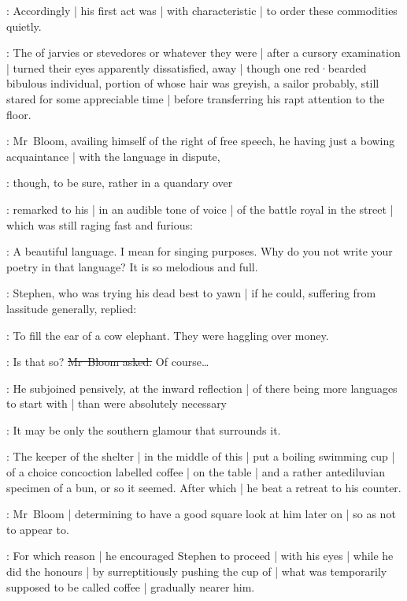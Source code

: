 :
Accordingly |
his first act was |
with characteristic  |
to order these commodities quietly.

:
The  of jarvies or stevedores or whatever they were |
after a cursory examination |
turned their eyes apparently dissatisfied,
away |
though one red·bearded bibulous individual,
portion of whose hair was greyish,
a sailor probably,
still stared for some appreciable time |
before transferring his rapt attention to the floor.

:
Mr~Bloom,
availing himself of the right of free speech,
he having just a bowing acquaintance |
with the language in dispute,

:
though,
to be sure,
rather in a quandary over 

:
remarked to his  |
in an audible tone of voice |
 of the battle royal in the street |
which was still raging fast and furious:

\Bloom:
A beautiful language.
I mean for singing purposes.
Why do you not write your poetry in that language?
It is so melodious and full.

:
Stephen,
who was trying his dead best to yawn |
if he could,
suffering from lassitude generally,
replied:

\Stephen:
To fill the ear of a cow elephant.
They were haggling over money.%

\Bloom:
Is that so?
\sout{Mr~Bloom asked.}
Of course\ldots

:
He subjoined pensively,
at the inward reflection |
of there being more languages to start with |
than were absolutely necessary

\Bloom:
It may be only the southern glamour that surrounds it.

:
The keeper of the shelter |
in the middle of this  |
put a boiling swimming cup |
of a choice concoction labelled coffee |
on the table |
and a rather antediluvian specimen of a bun,
or so it seemed.
After which |
he beat a retreat to his counter.

:
Mr~Bloom |
determining to have a good square look at him later on |
so as not to appear to.

:
For which reason |
he encouraged Stephen to proceed |
with his eyes |
while he did the honours |
by surreptitiously pushing the cup of |
what was temporarily supposed to be called coffee |
gradually nearer him.

